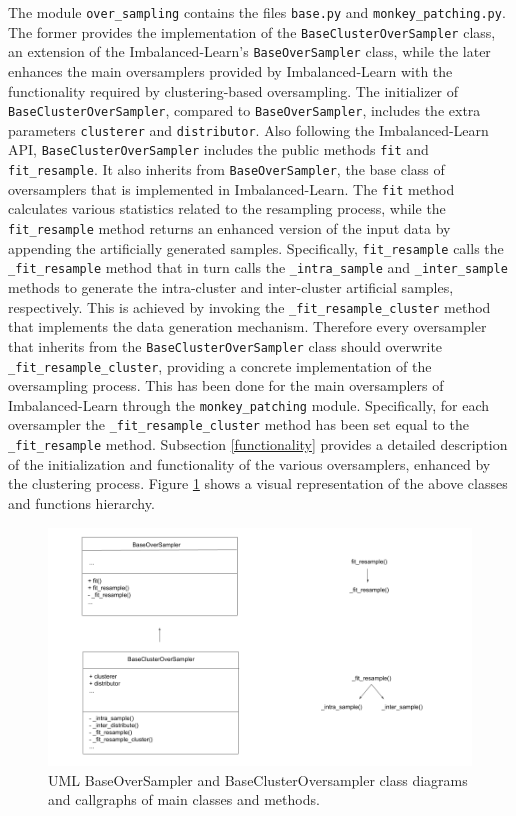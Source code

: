 \documentclass[preprint,12pt, a4paper]{elsarticle}
\begin{document}
The module \texttt{over\_sampling} contains the files \texttt{base.py} and \texttt{monkey\_patching.py}. The former provides the implementation of the \texttt{BaseClusterOverSampler} class, an extension of the Imbalanced-Learn's \texttt{BaseOverSampler} class, while the later enhances the main oversamplers provided by Imbalanced-Learn with the functionality required by clustering-based oversampling. The initializer of \texttt{BaseClusterOverSampler}, compared to \texttt{BaseOverSampler}, includes the extra parameters \texttt{clusterer} and \texttt{distributor}. Also following the Imbalanced-Learn API, \texttt{BaseClusterOverSampler} includes the public methods \texttt{fit} and \texttt{fit\_resample}. It also inherits from \texttt{BaseOverSampler}, the base class of oversamplers that is implemented in Imbalanced-Learn. The \texttt{fit} method calculates various statistics related to the resampling process, while the \texttt{fit\_resample} method returns an enhanced version of the input data by appending the artificially generated samples. Specifically, \texttt{fit\_resample} calls the \texttt{\_fit\_resample} method that in turn calls the \texttt{\_intra\_sample} and \texttt{\_inter\_sample} methods to generate the intra-cluster and inter-cluster artificial samples, respectively. This is achieved by invoking the \texttt{\_fit\_resample\_cluster} method that implements the data generation mechanism. Therefore every oversampler that inherits from the \texttt{BaseClusterOverSampler} class should overwrite \texttt{\_fit\_resample\_cluster}, providing a concrete implementation of the oversampling process. This has been done for the main oversamplers of Imbalanced-Learn through the \texttt{monkey\_patching} module. Specifically, for each oversampler the \texttt{\_fit\_resample\_cluster} method has been set equal to the \texttt{\_fit\_resample} method. Subsection \ref{functionality} provides a detailed description of the initialization and functionality of the various oversamplers, enhanced by the clustering process. Figure \ref{fig:oversampler_class_diagram} shows a visual representation of the above classes and functions hierarchy.

\begin{figure}[H]
	\centering
	\includegraphics[width=1\linewidth]{../analysis/oversampler_class_diagram}
	\caption{UML BaseOverSampler and BaseClusterOversampler class diagrams and callgraphs of main classes and methods.}
	\label{fig:oversampler_class_diagram}
\end{figure}
\end{document}
